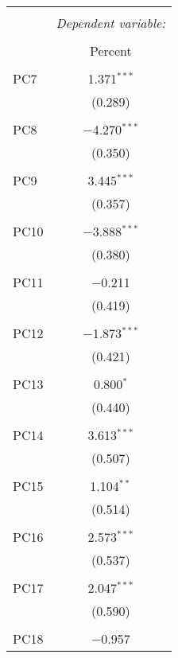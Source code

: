 
\begin{table}[!htbp] \centering 
  \caption{} 
  \label{} 
\begin{tabular}{@{\extracolsep{5pt}}lc} 
\\[-1.8ex]\hline 
\hline \\[-1.8ex] 
 & \multicolumn{1}{c}{\textit{Dependent variable:}} \\ 
\cline{2-2} 
\\[-1.8ex] & Percent \\ 
\hline \\[-1.8ex] 
 PC7 & 1.371$^{***}$ \\ 
  & (0.289) \\ 
  & \\ 
 PC8 & $-$4.270$^{***}$ \\ 
  & (0.350) \\ 
  & \\ 
 PC9 & 3.445$^{***}$ \\ 
  & (0.357) \\ 
  & \\ 
 PC10 & $-$3.888$^{***}$ \\ 
  & (0.380) \\ 
  & \\ 
 PC11 & $-$0.211 \\ 
  & (0.419) \\ 
  & \\ 
 PC12 & $-$1.873$^{***}$ \\ 
  & (0.421) \\ 
  & \\ 
 PC13 & 0.800$^{*}$ \\ 
  & (0.440) \\ 
  & \\ 
 PC14 & 3.613$^{***}$ \\ 
  & (0.507) \\ 
  & \\ 
 PC15 & 1.104$^{**}$ \\ 
  & (0.514) \\ 
  & \\ 
 PC16 & 2.573$^{***}$ \\ 
  & (0.537) \\ 
  & \\ 
 PC17 & 2.047$^{***}$ \\ 
  & (0.590) \\ 
  & \\ 
 PC18 & $-$0.957 \\ 

\end{tabular}
\end{table}
